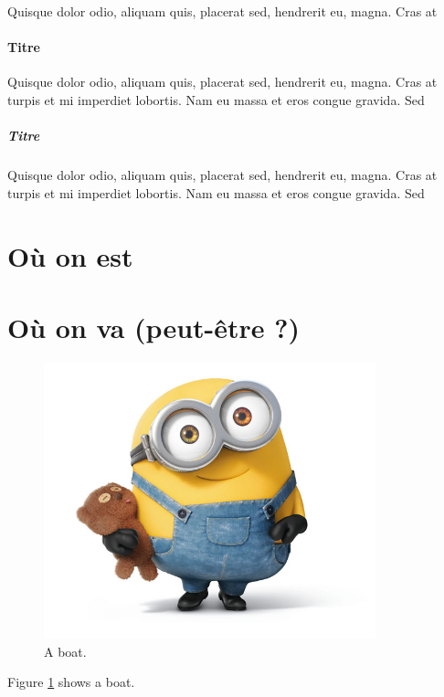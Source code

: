 \documentclass[a4paper]{article}
\begin{document}
Quisque dolor odio, aliquam quis, placerat sed, hendrerit eu, magna. Cras at

\paragraph{Titre}
Quisque dolor odio, aliquam quis, placerat sed, hendrerit eu, magna. Cras at
turpis et mi imperdiet lobortis. Nam eu massa et eros congue gravida. Sed

\subparagraph{Titre}
Quisque dolor odio, aliquam quis, placerat sed, hendrerit eu, magna. Cras at
turpis et mi imperdiet lobortis. Nam eu massa et eros congue gravida. Sed

\section{Où on est}

\section{Où on va (peut-être ?)}

\begin{figure}
  \includegraphics[height=8cm]{bob1.jpg}
  \caption{A boat.}
  \label{fig:boat1}
\end{figure}

Figure \ref{fig:boat1} shows a boat.
\end{document}
